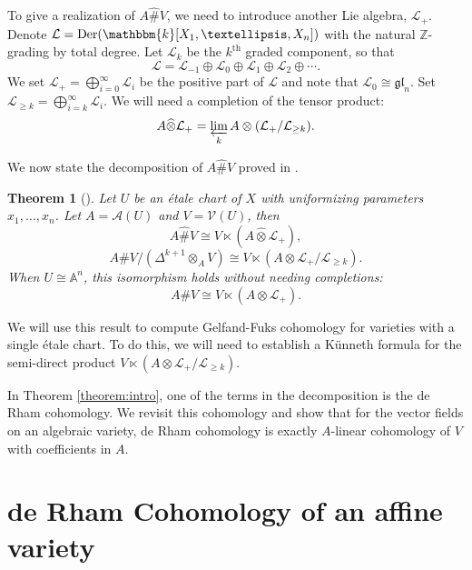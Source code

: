 \documentclass[12pt]{amsart}
\newcommand{\A}{{\mathcal{A}}}
\newcommand{\affine}{{\mathbb{A}}}
\newcommand{\gl}{{\mathfrak{gl}}}
\renewcommand{\k}{{\mathbbm{k}}}
\renewcommand{\L}{{\mathcal{L}}}
\newcommand{\V}{{\mathcal{V}}}
\newcommand{\Z}{{\mathbb{Z}}}
\newcommand{\Der}{{\operatorname{Der}}}
\newcommand{\fin}{{\textup{fin}}}
\renewcommand{\sp}{{\#}}
\newcommand{\wo}{\widehat{\otimes}}
\newtheorem{theorem}{Theorem}[section]
\theoremstyle{definition}
\begin{document}
To give a realization of $A \widehat{\sp} V$, we need to introduce another Lie algebra, $\L_+$. Denote $\L = \Der(\k[X_1, \dots, X_n])$ with the natural $\Z$-grading by total degree. Let $\L_k$ be the $k^\text{th}$ graded component, so that
\[
\L = \L_{-1} \oplus \L_0 \oplus \L_1 \oplus \L_2 \oplus \cdots .
\]
We set $\L_+ = \bigoplus_{i=0}^\infty \L_i$ be the positive part of $\L$ and note that $\L_0 \cong \gl_n$. 
Set $\L_{\geq k} = \bigoplus_{i=k}^\infty \L_i$. We will need a completion of the tensor product:
\[
A \wo \L_+ = \varprojlim\limits_k  A \otimes (\L_+/\L_{\geq k}).
\]


We now state the decomposition of $A \widehat{\sp} V$ proved in \cite{BilligIngalls}. 

\begin{theorem}[{\cite[Theorem 22, Remark 23]{BilligIngalls}}]\label{theorem:BItheorem22}
Let $U$ be an \'etale chart of $X$ with uniformizing parameters $x_1, \dots, x_n$. Let $A = \A(U)$ and $V = \V(U)$, then
\[
A \widehat{\sp} V \cong V \ltimes (A \wo \L_+),
\]
\[
A \sp V / (\Delta^{k+1} \otimes_A V) \cong V \ltimes (A \otimes \L_+/\L_{\geq k}).
\]
When $U \cong \affine^n$, this isomorphism holds without needing completions:
\[
A \sp V \cong V \ltimes (A \otimes \L_+).
\]
\end{theorem}

We will use this result to compute Gelfand-Fuks cohomology for varieties with a single \'etale chart. To do this, we will need to establish a K\"unneth formula for the semi-direct product  $V \ltimes (A \otimes \L_+/\L_{\geq k})$.  

In Theorem \ref{theorem:intro}, one of the terms in the decomposition is the de Rham cohomology. We revisit this cohomology and show that for the vector fields on an algebraic variety, de Rham cohomology is exactly $A$-linear cohomology of $V$ with coefficients in $A$. 

\section{de Rham Cohomology of an affine variety}\label{section:deRham}
\end{document}
